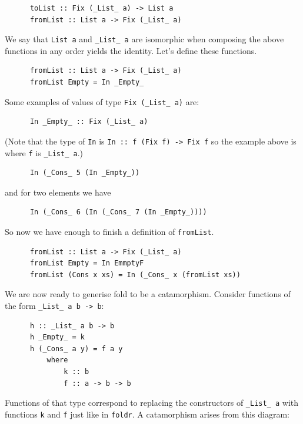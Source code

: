 \documentclass[a4paper,12pt]{article}
\theoremstyle{remark}
\begin{document}
  \begin{lstlisting}
      toList :: Fix (_List_ a) -> List a
      fromList :: List a -> Fix (_List_ a)  \end{lstlisting}

  We say that \lstinline{List a} and \lstinline{_List_ a} are isomorphic when composing the above functions
  in any order yields the identity. Let's define these functions.

  \begin{lstlisting}
      fromList :: List a -> Fix (_List_ a)
      fromList Empty = In _Empty_  \end{lstlisting}

  Some examples of values of type \lstinline{Fix (_List_ a)} are:

  \begin{lstlisting}
      In _Empty_ :: Fix (_List_ a)  \end{lstlisting}

  (Note that the type of \lstinline{In} is \lstinline{In :: f (Fix f) -> Fix f}
  so the example above is where \lstinline{f} is \lstinline{_List_ a}.)

  \begin{lstlisting}
      In (_Cons_ 5 (In _Empty_))  \end{lstlisting}

  and for two elements we have

  \begin{lstlisting}
      In (_Cons_ 6 (In (_Cons_ 7 (In _Empty_))))  \end{lstlisting}

  So now we have enough to finish a definition of \lstinline{fromList}.

  \begin{lstlisting}
      fromList :: List a -> Fix (_List_ a)
      fromList Empty = In EmmptyF
      fromList (Cons x xs) = In (_Cons_ x (fromList xs))  \end{lstlisting}

  We are now ready to generise fold to be a catamorphism. Consider functions of the form
  \lstinline{_List_ a b -> b}:

  \begin{lstlisting}
      h :: _List_ a b -> b
      h _Empty_ = k
      h (_Cons_ a y) = f a y
          where
              k :: b
              f :: a -> b -> b  \end{lstlisting}

  Functions of that type correspond to replacing the constructors of \lstinline{_List_ a} with functions \lstinline{k}
  and \lstinline{f} just like in \lstinline{foldr}. A catamorphism arises from this diagram:
\end{document}
